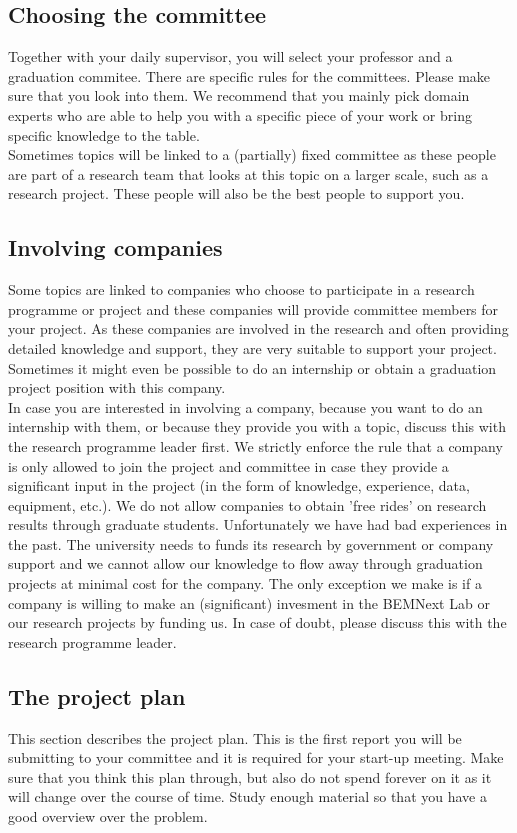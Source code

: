 \documentclass{latex-format/stylesheets/BEMNextstyle}
\begin{document}
\subsection*{Choosing the committee}
Together with your daily supervisor, you will select your professor and a graduation commitee. There are specific rules for the committees. Please make sure that you look into them. We recommend that you mainly pick domain experts who are able to help you with a specific piece of your work or bring specific knowledge to the table.\\
Sometimes topics will be linked to a (partially) fixed committee as these people are part of a research team that looks at this topic on a larger scale, such as a research project. These people will also be the best people to support you. 

\subsection*{Involving companies}
Some topics are linked to companies who choose to participate in a research programme or project and these companies will provide committee members for your project. As these companies are involved in the research and often providing detailed knowledge and support, they are very suitable to support your project. Sometimes it might even be possible to do an internship or obtain a graduation project position with this company.\\
In case you are interested in involving a company, because you want to do an internship with them, or because they provide you with a topic, discuss this with the research programme leader first. We strictly enforce the rule that a company is only allowed to join the project and committee in case they provide a significant input in the project (in the form of knowledge, experience, data, equipment, etc.). We do not allow companies to obtain 'free rides' on research results through graduate students. Unfortunately we have had bad experiences in the past. The university needs to funds its research by government or company support and we cannot allow our knowledge to flow away through graduation projects at minimal cost for the company. The only exception we make is if a company is willing to make an (significant) invesment in the BEMNext Lab or our research projects by funding us. In case of doubt, please discuss this with the research programme leader.

\subsection*{The project plan}
This section describes the project plan. This is the first report you will be submitting to your committee and it is required for your start-up meeting. Make sure that you think this plan through, but also do not spend forever on it as it will change over the course of time. Study enough material so that you have a good overview over the problem.
\end{document}
